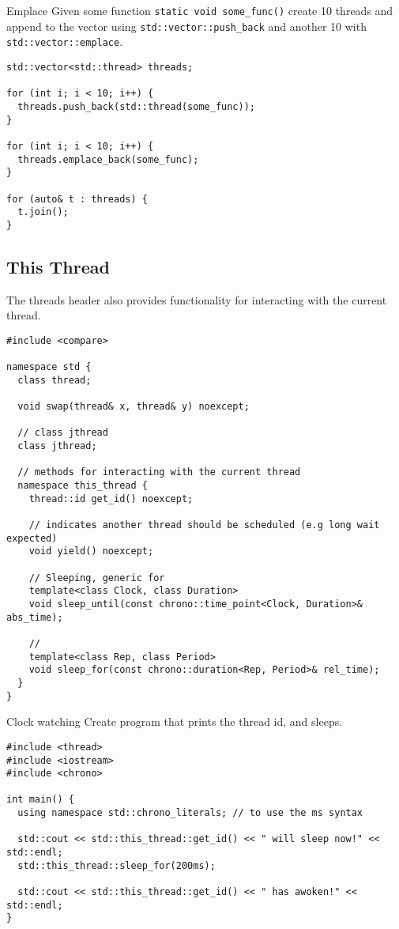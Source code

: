 \begin{examplebox}{Emplace}
	Given some function \texttt{static void some_func()} create 10 threads and append to the vector using \texttt{std::vector::push_back} and another 10 with \texttt{std::vector::emplace}.
	\tcblower
	\begin{verbatim}
std::vector<std::thread> threads;

for (int i; i < 10; i++) {
  threads.push_back(std::thread(some_func));
}

for (int i; i < 10; i++) {
  threads.emplace_back(some_func);
}

for (auto& t : threads) {
  t.join();
}    
  \end{verbatim}
\end{examplebox}

\subsection{This Thread}
The threads header also provides functionality for interacting with the current thread.
\begin{verbatim}
#include <compare>

namespace std {
  class thread;
  
  void swap(thread& x, thread& y) noexcept;
  
  // class jthread
  class jthread;
  
  // methods for interacting with the current thread
  namespace this_thread {
    thread::id get_id() noexcept;

    // indicates another thread should be scheduled (e.g long wait expected)
    void yield() noexcept;

    // Sleeping, generic for  
    template<class Clock, class Duration>
    void sleep_until(const chrono::time_point<Clock, Duration>& abs_time);

    //
    template<class Rep, class Period>
    void sleep_for(const chrono::duration<Rep, Period>& rel_time);
  }
}
\end{verbatim}
\begin{examplebox}{Clock watching}
	Create program that prints the thread id, and sleeps.
	\tcblower
	\begin{verbatim}
#include <thread>
#include <iostream>
#include <chrono>

int main() {
  using namespace std::chrono_literals; // to use the ms syntax

  std::cout << std::this_thread::get_id() << " will sleep now!" << std::endl;
  std::this_thread::sleep_for(200ms);

  std::cout << std::this_thread::get_id() << " has awoken!" << std::endl;
}
  \end{verbatim}
\end{examplebox}

